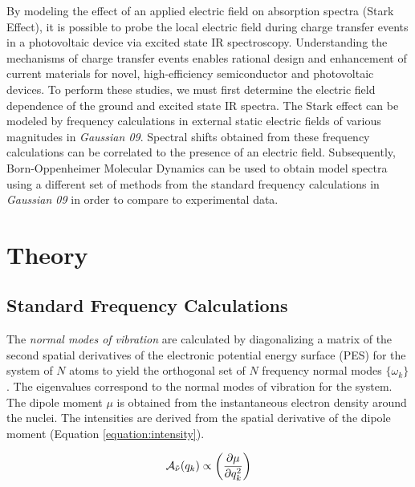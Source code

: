 \documentclass[journal=jpclcd, manuscript=letter, layout=twocolumn]{achemso}
\begin{document}
 
 By modeling the effect of an applied electric field on absorption spectra (Stark Effect), it is 
 possible to probe the local electric field during charge transfer events in a 
 photovoltaic device via excited state IR spectroscopy. Understanding the mechanisms of charge transfer events enables rational design and enhancement of current materials for novel, high-efficiency semiconductor and photovoltaic devices. To perform these studies, we must first determine the electric field dependence of the ground and excited state IR spectra. The Stark effect can be modeled by frequency calculations in external static electric fields of various magnitudes in \emph{Gaussian 09}. Spectral shifts obtained from these frequency calculations can be correlated to the presence of an electric field. Subsequently, Born-Oppenheimer Molecular Dynamics can be used to obtain model spectra using a different set of methods from the standard frequency calculations in \emph{Gaussian 09} in order to compare to experimental data. \cite{g09}

\section{Theory}

\subsection{Standard Frequency Calculations}

\par The \emph{normal modes of vibration} are calculated by diagonalizing a matrix of the second spatial derivatives of the electronic potential energy surface (PES) for the system of $N$ atoms to yield the orthogonal set of $N$ frequency normal modes $\{\omega_k\}$.  The eigenvalues correspond to the normal modes of vibration for the system. The dipole moment $\mu$ is obtained from the instantaneous electron density around the nuclei. The intensities are derived from the spatial derivative of the dipole moment (Equation \ref{equation:intensity}). \cite{g09}  

\begin{equation}
\begin{split}
\centering
\mathcal{A}_{\tilde{\nu}}(q_{k}) \propto \bigg(\frac{\partial \mu}{\partial q_{k}^{2}}\bigg)
\label{equation:intensity}
\end{split}
\end{equation}
\end{document}
